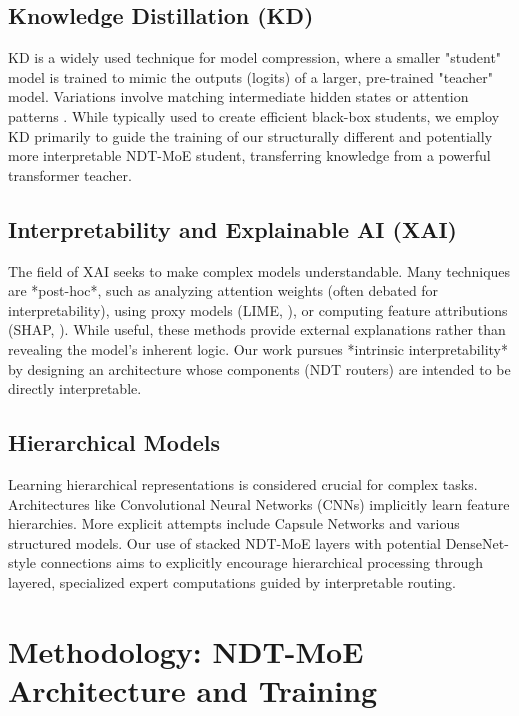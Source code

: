 \documentclass[11pt,a4paper]{article}
\begin{document}
\subsection{Knowledge Distillation (KD)}
KD \citep{hinton2015distilling} is a widely used technique for model compression, where a smaller "student" model is trained to mimic the outputs (logits) of a larger, pre-trained "teacher" model. Variations involve matching intermediate hidden states \citep{romero2015fitnets} or attention patterns \citep{zagoruyko2017paying}. While typically used to create efficient black-box students, we employ KD primarily to guide the training of our structurally different and potentially more interpretable NDT-MoE student, transferring knowledge from a powerful transformer teacher.

\subsection{Interpretability and Explainable AI (XAI)}
The field of XAI seeks to make complex models understandable. Many techniques are *post-hoc*, such as analyzing attention weights \citep{jain2019attention} (often debated for interpretability), using proxy models (LIME, \citep{ribeiro2016why}), or computing feature attributions (SHAP, \citep{lundberg2017unified}). While useful, these methods provide external explanations rather than revealing the model's inherent logic. Our work pursues *intrinsic interpretability* by designing an architecture whose components (NDT routers) are intended to be directly interpretable.

\subsection{Hierarchical Models}
Learning hierarchical representations is considered crucial for complex tasks. Architectures like Convolutional Neural Networks (CNNs) implicitly learn feature hierarchies. More explicit attempts include Capsule Networks \citep{sabour2017dynamic} and various structured models. Our use of stacked NDT-MoE layers with potential DenseNet-style connections aims to explicitly encourage hierarchical processing through layered, specialized expert computations guided by interpretable routing.

\section{Methodology: NDT-MoE Architecture and Training}
\label{sec:methodology}
\end{document}
